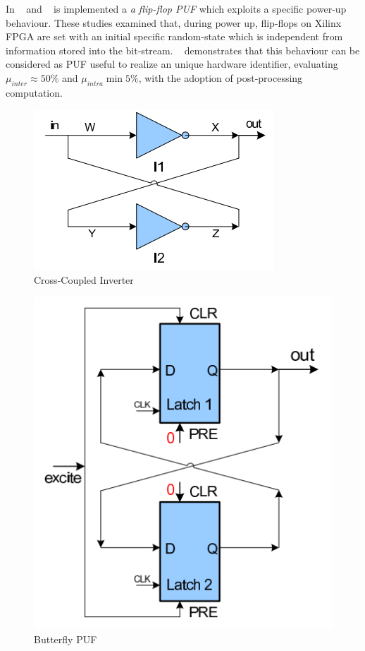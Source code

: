 \documentclass[../tesi.tex]{subfiles}
\begin{document}
In ~\cite{maes2008intrinsic} and ~\cite{van2010hardware} is implemented a \emph{a flip-flop PUF} which exploits a specific power-up behaviour. These studies examined that, during power up,  flip-flops on Xilinx FPGA are set with an initial specific random-state which is independent from information stored into the bit-stream. ~\cite{maes2008intrinsic} demonstrates that this behaviour can be considered as PUF useful to realize an unique hardware identifier, evaluating   $\mu_{inter} \approx 50\%$ and $\mu_{intra} \min 5\%$, with the adoption of post-processing computation. 
\begin{figure}
\centering
\includegraphics[scale=0.50]{images/butterflypuf.png}
\caption{Cross-Coupled Inverter}
\label{fig:butterflypuf}
\end{figure}
\begin{figure}
\centering
\includegraphics[scale=0.40]{images/ffbutterflypuf.png}
\caption{Butterfly PUF}
\label{fig:butterflypuf}
\end{figure}
\end{document}
